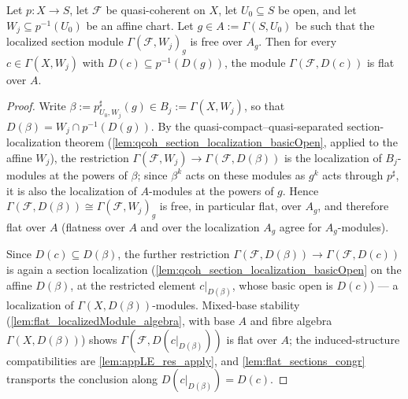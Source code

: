 \begin{lemma}
  \leanok
  \label{lem:flat_section_chartBasic}
  Let \(p : X \to S\), let \(\mathcal F\) be quasi-coherent on \(X\), let
  \(U_0 \subseteq S\) be open, and let \(W_j \subseteq p^{-1}(U_0)\) be an
  affine chart. Let \(g \in A := \Gamma(S, U_0)\) be such that the localized
  section module \(\Gamma(\mathcal F, W_j)_g\) is free over \(A_g\). Then for
  every \(c \in \Gamma(X, W_j)\) with \(D(c) \subseteq p^{-1}(D(g))\), the
  module \(\Gamma(\mathcal F, D(c))\) is flat over \(A\).
\end{lemma}
\begin{proof}
  \leanok
  Write \(\beta := p^\sharp_{U_0, W_j}(g) \in B_j := \Gamma(X, W_j)\), so that
  \(D(\beta) = W_j \cap p^{-1}(D(g))\). By the quasi-compact--quasi-separated
  section-localization theorem
  (\cref{lem:qcoh_section_localization_basicOpen}, applied to the affine
  \(W_j\)), the restriction
  \(\Gamma(\mathcal F, W_j) \to \Gamma(\mathcal F, D(\beta))\) is the
  localization of \(B_j\)-modules at the powers of \(\beta\); since
  \(\beta^k\) acts on these modules as \(g^k\) acts through \(p^\sharp\), it
  is also the localization of \(A\)-modules at the powers of \(g\). Hence
  \(\Gamma(\mathcal F, D(\beta)) \cong \Gamma(\mathcal F, W_j)_g\) is free,
  in particular flat, over \(A_g\), and therefore flat over \(A\) (flatness
  over \(A\) and over the localization \(A_g\) agree for
  \(A_g\)-modules).

  Since \(D(c) \subseteq D(\beta)\), the further restriction
  \(\Gamma(\mathcal F, D(\beta)) \to \Gamma(\mathcal F, D(c))\) is again a
  section localization (\cref{lem:qcoh_section_localization_basicOpen} on the
  affine \(D(\beta)\), at the restricted element \(c|_{D(\beta)}\), whose
  basic open is \(D(c)\)) — a localization of
  \(\Gamma(X, D(\beta))\)-modules. Mixed-base stability
  (\cref{lem:flat_localizedModule_algebra}, with base \(A\) and fibre algebra
  \(\Gamma(X, D(\beta))\)) shows \(\Gamma(\mathcal F, D(c|_{D(\beta)}))\) is
  flat over \(A\); the induced-structure compatibilities are
  \cref{lem:appLE_res_apply}, and \cref{lem:flat_sections_congr} transports
  the conclusion along \(D(c|_{D(\beta)}) = D(c)\).
\end{proof}

